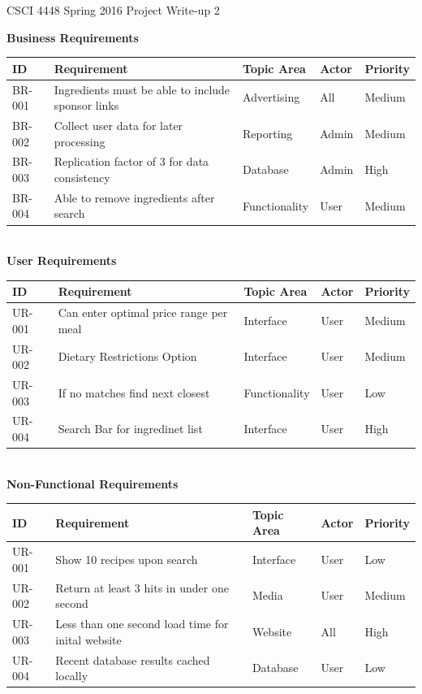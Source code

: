 \documentclass[12pt]{article}
\begin{document}
CSCI 4448 Spring 2016 \hfill Project Write-up 2\\

\hrulefill
\begin{center}
  \textbf{Business Requirements} \\
\begin{tabular}{| l | l | l | l | l | }
  \hline
  \textbf{ID}  & \textbf{Requirement} & \textbf{Topic Area} & \textbf{Actor} & \textbf{Priority} \\ \hline
  BR-001 & Ingredients must be able to include sponsor links & Advertising & All & Medium \\ \hline 
  BR-002 & Collect user data for later processing & Reporting & Admin & Medium \\ \hline
  BR-003 & Replication factor of 3 for data consistency & Database & Admin & High \\ \hline
  BR-004 & Able to remove ingredients after search & Functionality & User & Medium \\ \hline

\end{tabular}
\\
  \vspace{1cm}
 \textbf{User Requirements} \\
\begin{tabular}{| l | l | l | l | l | }
  \hline
  \textbf{ID}  & \textbf{Requirement} & \textbf{Topic Area} & \textbf{Actor} & \textbf{Priority} \\ \hline
  UR-001 & Can enter optimal price range per meal & Interface & User & Medium \\ \hline 
  UR-002 & Dietary Restrictions Option  & Interface & User & Medium \\ \hline
  UR-003 & If no matches find next closest & Functionality & User & Low \\ \hline
  UR-004 & Search Bar for ingredinet list & Interface & User & High \\ \hline
\end{tabular}
\\
  \vspace{1cm}
  \textbf{Non-Functional Requirements}
\begin{tabular}{| l | l | l | l | l | }
  \hline
  \textbf{ID}  & \textbf{Requirement} & \textbf{Topic Area} & \textbf{Actor} & \textbf{Priority} \\ \hline
  UR-001 & Show 10 recipes upon search  &  Interface & User & Low  \\ \hline 
  UR-002 & Return at least 3 hits in under one second & Media & User &  Medium\\ \hline
  UR-003 & Less than one second load time for inital website &  Website & All & High \\ \hline
  UR-004 & Recent database results cached locally & Database & User & Low \\ \hline
\end{tabular}
\end{center}
\end{document}
